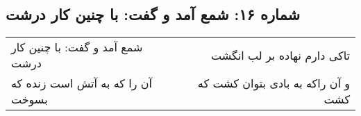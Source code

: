 \begin{center}
\section*{شماره ۱۶: شمع آمد و گفت: با چنین کار درشت}
\label{sec:016}
\begin{longtable}{l p{0.5cm} r}
شمع آمد و گفت: با چنین کار درشت
&&
تاکی دارم نهاده بر لب انگشت
\\
آن را که به آتش است زنده که بسوخت
&&
و آن راکه به بادی بتوان کشت که کشت
\\
\end{longtable}
\end{center}
